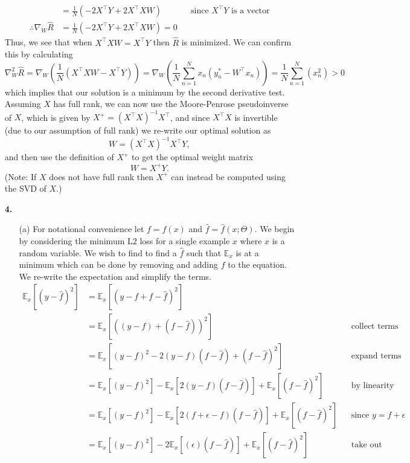 \documentclass [10pt]{article}
\begin{document}
\begin{enumerate}
\begin{align}
		&=\frac{1}{N}(-2X^{\top}Y+2X^{\top}XW)&&\text{since $X^{\top}Y$ is a vector}\nonumber\\
		\therefore\nabla_{W}\hat{R}&=\frac{1}{N}(-2X^{\top}Y+2X^{\top}XW)=0\nonumber
	\end{align}
	Thus, we see that when $X^{\top}XW=X^{\top}Y$ then $\hat{R}$ is minimized. We can confirm this by calculating$$\nabla_{W}^{2}\hat{R}=\nabla_{W}(\frac{1}{N}(X^{\top}XW-X^{\top}Y))=\nabla_{W}(\frac{1}{N}\sum_{n=1}^{N}x_{n}(y_{n}^{*}-W^{\top}x_{n}))=\frac{1}{N}\sum_{n=1}^{N}(x_{n}^{2})>0$$which implies that our solution is a minimum by the second derivative test. Assuming $X$ has full rank, we can now use the Moore-Penrose pseudoinverse of $X$, which is given by $X^{+}=(X^{\top}X)^{-1}X^{\top}$, and since $X^{\top}X$ is invertible (due to our assumption of full rank) we re-write our optimal solution as$$W=(X^{\top}X)^{-1}X^{\top}Y,$$and then use the definition of $X^{+}$ to get the optimal weight matrix$$W=X^{+}Y.$$ (Note: If $X$ does not have full rank then $X^{+}$ can instead be computed using the SVD of $X$.)
	\newpage
	\item[\textbf{4.$\>$}]
	\begin{enumerate}
		\item[(a)]For notational convenience let $f=f(x)$ and $\hat{f}=\hat{f}(x;\Theta)$. We begin by considering the minimum L$2$ loss for a single example $x$ where $x$ is a random variable. We wish to find to find a $\hat{f}$ such that $\mathbb{E}_{x}$ is at a minimum which can be done by removing and adding $f$ to the equation. We re-write the expectation and simplify the terms.
		\begin{align}
			\mathbb{E}_{x}[(y-\hat{f})^{2}]&=\mathbb{E}_{x}[(y-f+f-\hat{f})^{2}]\nonumber\\
			&=\mathbb{E}_{x}[((y-f)+(f-\hat{f}))^{2}]&&\text{collect terms}\nonumber\\
			&=\mathbb{E}_{x}[(y-f)^{2}-2(y-f)(f-\hat{f})+(f-\hat{f})^{2}]&&\text{expand terms}\nonumber\\
			&=\mathbb{E}_{x}[(y-f)^{2}]-\mathbb{E}_{x}[2(y-f)(f-\hat{f})]+\mathbb{E}_{x}[(f-\hat{f})^{2}]&&\text{by linearity}\nonumber\\
			&=\mathbb{E}_{x}[(y-f)^{2}]-\mathbb{E}_{x}[2(f+\epsilon-f)(f-\hat{f})]+\mathbb{E}_{x}[(f-\hat{f})^{2}]&&\text{since $y = f + \epsilon$}\nonumber\\
			&=\mathbb{E}_{x}[(y-f)^{2}]-2\mathbb{E}_{x}[(\epsilon)(f-\hat{f})]+\mathbb{E}_{x}[(f-\hat{f})^{2}]&&\text{take out constant}\nonumber\\

\end{align}
\end{enumerate}
\end{enumerate}
\end{document}
